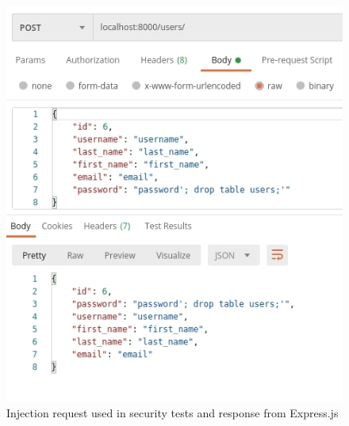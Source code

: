 \begin{figure}[H]
    \centering
    \includegraphics[width=0.6\columnwidth]{figures/pictures/injectionRequest.jpg}
    \caption{Injection request used in security tests and response from Express.js}
    \label{fig:injectionRequest}
\end{figure}
